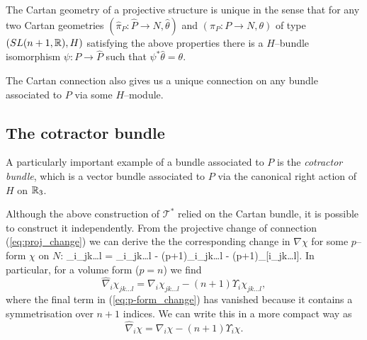 The Cartan geometry of a projective structure is unique in the sense that for any two Cartan geometries $(\widehat{\pi}_P:\widehat{P}\rightarrow N,\widehat{\theta})$ and $(\pi_P:P\rightarrow N,\theta)$ of type $(SL(n+1,\mathbb{R}),H)$ satisfying the above properties there is a $H$--bundle isomorphism $\psi:P\rightarrow\widehat{P}$ such that $\psi^*\widehat{\theta}=\theta$. %

The Cartan connection also gives us a unique connection on any bundle associated to $P$ via some $H$--module.


\subsection{The cotractor bundle}
A particularly important example of a bundle associated to $P$ is the \textit{cotractor bundle}, which is a vector bundle associated to $P$ via the canonical right action of $H$ on $\mathbb{R}_3$.


Although the above construction of $\mathcal{T}^*$ relied on the Cartan bundle, it is possible to construct it independently. %
From the projective change of connection (\ref{eq:proj_change}) we can derive the the corresponding change in $\nabla\chi$ for some $p$--form $\chi$ on $N$:
\be \label{eq:p-form_change}
\widehat{\nabla}_i\chi_{jk\dots l} = \nabla_i\chi_{jk\dots l} - (p+1)\Upsilon_i\chi_{jk\dots l} - (p+1)\Upsilon_{[i}\chi_{jk\dots l]}.
\ee
In particular, for a volume form ($p=n$) we find
\[
\widehat{\nabla}_i\chi_{jk\dots l} = \nabla_i\chi_{jk\dots l} - (n+1)\Upsilon_i\chi_{jk\dots l},
\]
where the final term in (\ref{eq:p-form_change}) has vanished because it contains a symmetrisation over $n+1$ indices. We can write this in a more compact way as
\[
\widehat{\nabla}_i\chi = \nabla_i\chi - (n+1)\Upsilon_i\chi.
\]

